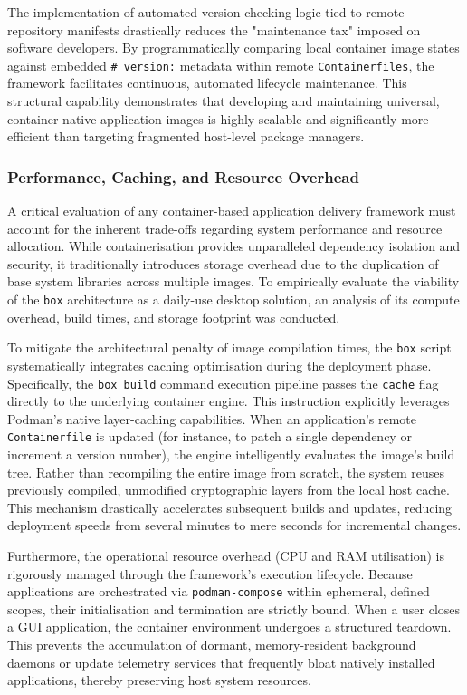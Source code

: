 \documentclass[journal,onecolumn]{IEEEtran}
\newcommand{\code}[1]{\texttt{#1}}
\begin{document}
The implementation of automated version-checking logic tied to remote repository manifests drastically reduces the "maintenance tax" imposed on software developers. By programmatically comparing local container image states against embedded \code{\# version:} metadata within remote \code{Containerfiles}, the framework facilitates continuous, automated lifecycle maintenance. This structural capability demonstrates that developing and maintaining universal, container-native application images is highly scalable and significantly more efficient than targeting fragmented host-level package managers.

\subsubsection{Performance, Caching, and Resource Overhead}

A critical evaluation of any container-based application delivery framework must account for the inherent trade-offs regarding system performance and resource allocation. While containerisation provides unparalleled dependency isolation and security, it traditionally introduces storage overhead due to the duplication of base system libraries across multiple images. To empirically evaluate the viability of the \code{box} architecture as a daily-use desktop solution, an analysis of its compute overhead, build times, and storage footprint was conducted.

To mitigate the architectural penalty of image compilation times, the \code{box} script systematically integrates caching optimisation during the deployment phase. Specifically, the \code{box build} command execution pipeline passes the \code{cache} flag directly to the underlying container engine. This instruction explicitly leverages Podman's native layer-caching capabilities. When an application's remote \code{Containerfile} is updated (for instance, to patch a single dependency or increment a version number), the engine intelligently evaluates the image's build tree. Rather than recompiling the entire image from scratch, the system reuses previously compiled, unmodified cryptographic layers from the local host cache. This mechanism drastically accelerates subsequent builds and updates, reducing deployment speeds from several minutes to mere seconds for incremental changes.

Furthermore, the operational resource overhead (CPU and RAM utilisation) is rigorously managed through the framework's execution lifecycle. Because applications are orchestrated via \code{podman-compose} within ephemeral, defined scopes, their initialisation and termination are strictly bound. When a user closes a GUI application, the container environment undergoes a structured teardown. This prevents the accumulation of dormant, memory-resident background daemons or update telemetry services that frequently bloat natively installed applications, thereby preserving host system resources.
\end{document}
